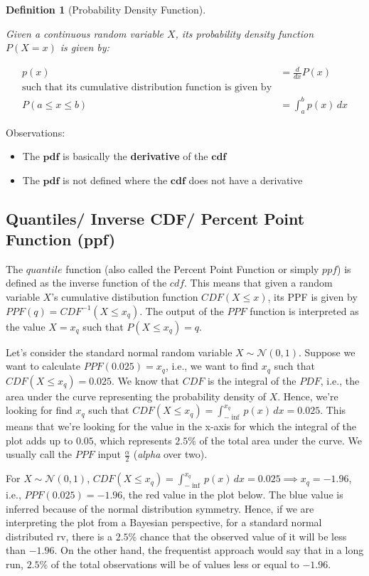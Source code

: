 \documentclass{article}
\newtheorem{definition}{Definition}[section]
\begin{document}
\begin{definition}[Probability Density Function]
	\label{def:pdf}
	
	Given a continuous random variable $X$, its probability density function $P(X = x)$ is given by:
	
	\begin{align}
		p(x) &= \frac{d}{dx} P(x) \\
		\text{such that its cumulative distribution function is given by}& \\
		P(a \leq x \leq b) &= \int_{a}^{b} p(x) \, dx
	\end{align}

\end{definition}


Observations:
\begin{itemize}
	\item The $\mathbf{pdf}$ is basically the \textbf{derivative} of the $\mathbf{cdf}$
	\item The $\mathbf{pdf}$ is not defined where the $\mathbf{cdf}$ does not have a derivative 
\end{itemize}

\subsection{Quantiles/ Inverse CDF/  Percent Point Function (ppf)}

The $quantile$ function (also called the Percent Point Function or simply $ppf$) is defined as the inverse function of the $cdf$. This means that given a random variable $X$'s cumulative distibution function $CDF(X \leq x)$, its PPF is given by $PPF(q) = CDF^{-1}(X \leq x_q)$. The output of the $PPF$ function is interpreted as the value $X = x_q$ such that $P(X \leq x_q) = q$.

Let's consider the standard normal random variable $X \sim \mathcal{N}(0, 1)$. Suppose we want to calculate $PPF(0.025) = x_q$, i.e., we want to find $x_q$ such that $CDF(X \leq x_q) = 0.025$. We know that $CDF$ is the integral of the $PDF$, i.e., the area under the curve representing the probability density of $X$. Hence, we're looking for find $x_q$ such that $CDF(X \leq x_q) = \int_{-\inf}^{x_q} p(x) \, dx = 0.025$. This means that we're looking for the value in the x-axis for which the integral of the plot adds up to $0.05$, which represents $2.5\%$ of the total area under the curve. We usually call the $PPF$ input $\frac{\alpha}{2}$ (\textit{alpha} over two).

For $X \sim \mathcal{N}(0, 1)$, $CDF(X \leq x_q) = \int_{-\inf}^{x_q} p(x) \, dx = 0.025 \implies x_q = -1.96 $, i.e., $PPF(0.025) = -1.96$, the red value in the plot below. The blue value is inferred because of the normal distribution symmetry. Hence, if we are interpreting the plot from a Bayesian perspective, for a standard normal distributed rv, there is a $2.5\%$ chance that the observed value of it will be less than $-1.96$. On the other hand, the frequentist approach would say that in a long run, $2.5\%$ of the total observations will be of values less or equal to $-1.96$.
\end{document}
